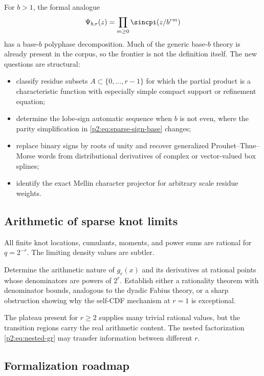 \documentclass[11pt,oneside]{article}
\theoremstyle{definition}
\begin{document}
For $b>1$, the formal analogue
\begin{equation}
 \Psi_{b,r}(z)=\prod_{m\ge0}\sincpi(z/b^{rm})              \label{p2:eq:base-b-sparse}
\end{equation}
has a base-$b$ polyphase decomposition.  Much of the generic base-$b$ theory is
already present in the corpus, so the frontier is not the definition itself.
The new questions are structural:
\begin{itemize}
\item classify residue subsets $A\subset\{0,\ldots,r-1\}$ for which the
      partial product is a characteristic function with especially simple
      compact support or refinement equation;
\item determine the lobe-sign automatic sequence when $b$ is not even, where
      the parity simplification in \eqref{p2:eq:sparse-sign-base} changes;
\item replace binary signs by roots of unity and recover generalized
      Prouhet--Thue--Morse words from distributional derivatives of complex or
      vector-valued box splines;
\item identify the exact Mellin character projector for arbitrary scale
      residue weights.
\end{itemize}

\subsection{Arithmetic of sparse knot limits}

All finite knot locations, cumulants, moments, and power sums are rational for
$q=2^{-r}$.  The limiting density values are subtler.

\begin{problem}
Determine the arithmetic nature of $g_r(x)$ and its derivatives at rational
points whose denominators are powers of $2^r$.  Establish either a rationality
theorem with denominator bounds, analogous to the dyadic Fabius theory, or a
sharp obstruction showing why the self-CDF mechanism at $r=1$ is exceptional.
\end{problem}

The plateau present for $r\ge2$ supplies many trivial rational values, but the
transition regions carry the real arithmetic content.  The nested
factorization \eqref{p2:eq:nested-gr} may transfer information between different
$r$.

\subsection{Formalization roadmap}
\end{document}
